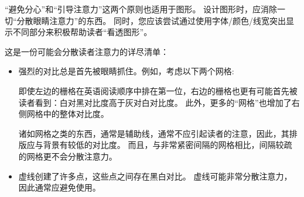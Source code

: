 ``避免分心''和``引导注意力''这两个原则也适用于图形。 设计图形时，应消除一切``分散眼睛注意力''的东西。 同时，您应该尝试通过使用字体/颜色/线宽突出显示不同部分来积极帮助读者``看透图形''。


这是一份可能会分散读者注意力的详尽清单：
%
\begin{itemize}
    \item 强烈的对比总是首先被眼睛抓住。例如，考虑以下两个网格:

    \medskip\par

    \medskip

    即使左边的栅格在英语阅读顺序中排在第一位，右边的栅格也更有可能首先被读者看到：白对黑对比度高于灰对白对比度。 此外，更多的``网格''也增加了右侧网格中的整体对比度。


    诸如网格之类的东西，通常是辅助线，通常不应引起读者的注意，因此，其排版应与背景有较低的对比度。 而且，与非常紧密间隔的网格相比，间隔较疏的网格更不会分散注意力。
    \item 虚线创建了许多点，这些点之间存在黑白对比。 虚线可能非常分散注意力，因此通常应避免使用。



\end{itemize}

